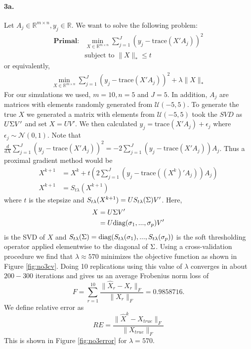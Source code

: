 \documentclass[12pt, leqno]{article}
\providecommand{\norm}[1]{\lVert#1\rVert}
\let\oldhat\hat
\renewcommand{\hat}[1]{\oldhat{{#1}}}
\def\s{\ensuremath\Sigma}
\newcommand{\trace}{\mathrm{trace}}
\newcommand{\diag}{\mathrm{diag}}
\begin{document}
\paragraph{3a.} Let $A_j \in \mathbb{R}^{m \times n}, y_j \in
\mathbb{R}$. We want to solve the following problem: 
\begin{align*}
\textbf{Primal:}&\min_{X \in \mathbb{R}^{m \times n}} \sum_{j = 1}^J
                  (y_j - \trace (X'A_j))^2 \\
&\text{subject to } \norm{X}_* \leq t
\end{align*}
or equivalently,
\begin{align*}
\min_{X \in \mathbb{R}^{m \times n}} \sum_{j = 1}^J
                  (y_j - \trace (X'A_j))^2 + \lambda \norm{X}_*
\end{align*} 
For our simulations we used, $m = 10,n = 5$ and $J = 5$. In addition,
$A_j$ are matrices with elements randomly generated from
$\mathcal{U}(-5,5)$. To generate the true $X$ we generated a matrix
with elements from $\mathcal{U}(-5,5)$ took the $SVD$ as $U \s V'$ and set
$X = UV'$. We then calculated $y_j =  \trace (X'A_j) +
\epsilon_j$ where $\epsilon_j \sim \mathcal{N}(0,1)$. 
Note that $\frac{d}{dX} \sum_{j = 1}^J
                  (y_j - \trace (X'A_j))^2 = -2 \sum_{j = 1}^J(y_j -
                  \trace (X'A_j))A_j$.
Thus a proximal gradient method would be
\begin{align}
X^{k+1} &= X^{k} + t(2 \sum_{j = 1}^J(y_j -
                  \trace ((X^k)'A_j))A_j) \\
X^{k+1} &= S_{t\lambda}(X^{k+1})
\end{align}
where $t$ is the stepsize and $S_{t\lambda}(X^{k+1}) =
 U S_{t\lambda}(\s) V'$. Here, 
\begin{align*}
X &= U \s V' \\ 
&= U \diag(\sigma_1,...,\sigma_p) V' 
\end{align*} 
is the SVD of $X$ and $S_{t\lambda}(\s) =
\diag(S_{t\lambda}(\sigma_1),...,S_{t\lambda}(\sigma_p))$ is the soft
thresholding operator applied elementwise to the diagonal of $\s$.
Using a cross-validation procedure we find that $\lambda \approx 570$
minimizes the objective function as shown in Figure \ref{fig:no3cv}. Doing 10 replications using this
value of $\lambda$ converges in about $200-300$ iterations and gives
us an average Frobenius norm loss of
\[
F = \sum_{r = 1}^{10}\frac{\norm{\hat{X}_r-X_r}_F}{\norm{X_r}_F} =   0.9858716.
\]
We define relative error as 
\[
RE = \frac{\norm{\hat{X}^k-X_{true}}_F}{\norm{X_{true}}_F}
\]
This is shown in Figure \ref{fig:no3error} for $\lambda = 570$.
\end{document}
